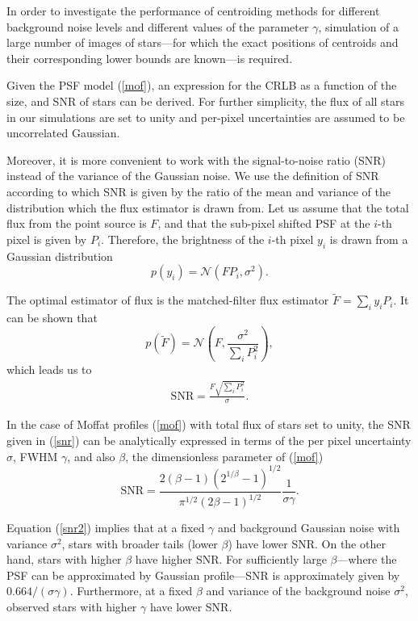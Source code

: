 \documentclass[onecolumn]{aastex61}
\newcommand{\beq}{\begin{equation}}
\newcommand{\eeq}{\end{equation}}
\newcommand{\todo}[1]{{\textcolor{dred}{ #1}}}
\begin{document}
In order to investigate the performance of centroiding methods for
 different background noise levels and different
values of the parameter $\gamma$, simulation of a large number of images of stars---for which the exact positions of centroids
and their corresponding lower bounds are known---is required.


Given the PSF model (\ref{mof}), an expression for the CRLB as a function of the size, and SNR of stars can be 
derived. For further simplicity, the flux of all stars in our simulations are set to unity and per-pixel 
uncertainties are assumed to be uncorrelated Gaussian.

Moreover, it is more convenient to work with the signal-to-noise ratio
(SNR) instead of the variance of the Gaussian noise.
We use the definition of SNR according to which SNR is given by the ratio
 of the mean and variance of the distribution
which the flux estimator is drawn from. Let us assume that the total flux from
the point source is $F$, and that the sub-pixel shifted PSF at the $i$-th pixel is given
by $P_{i}$. Therefore, the brightness of the $i$-th pixel $y_{i}$ is drawn from
a Gaussian distribution 
\beq
p(y_{i}) = \mathcal{N}(FP_{i},\sigma^{2}). 
\eeq

The optimal estimator of flux is the matched-filter flux estimator 
$\tilde{F}=\sum_{i}y_{i}P_{i}$. It can be shown that 
\beq
p(\tilde{F}) = \mathcal{N}(F , \frac{\sigma^{2}}{\sum_{i}P_{i}^{2}}),
\eeq  
which leads us to
\beq
\begin{array}{l}
\text{SNR} = \frac{F\sqrt{\sum_{i} P_{i}^{2}}}{\sigma}.
\end{array}
\label{snr}
\eeq

 In the case of Moffat profiles (\ref{mof}) with total flux of stars set to unity, 
the SNR given in (\ref{snr}) can be analytically 
expressed in terms of the per pixel uncertainty
$\sigma$, FWHM $\gamma$, and also $\beta$, \todo{the dimensionless parameter of (\ref{mof})}
\beq
\text{SNR} = \frac{2(\beta-1)(2^{1/\beta}-1)^{1/2}}{\pi^{1/2}(2\beta-1)^{1/2}}\frac{1}{\sigma \gamma}.
\label{snr2}
\eeq

Equation (\ref{snr2}) implies that at a fixed $\gamma$ and background Gaussian noise 
with variance $\sigma^{2}$, stars with broader tails (lower $\beta$) have lower SNR.
On the other hand, stars with higher $\beta$ have higher SNR. 
For sufficiently large $\beta$---where the PSF can be
approximated by Gaussian profile---SNR is approximately given by $0.664/(\sigma\gamma)$.
Furthermore, at a fixed $\beta$ and variance of the background noise $\sigma^{2}$,
observed stars with higher $\gamma$ have lower SNR.  
\end{document}
